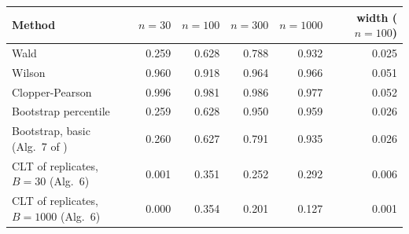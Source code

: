 \begin{tabular}{lrrrrr}\toprule
Method & $n=30$ & $n=100$ & $n=300$ & $n=1000$ & width ($n{=}100$)\\\midrule
Wald & 0.259 & 0.628 & 0.788 & 0.932 & 0.025\\
Wilson & 0.960 & 0.918 & 0.964 & 0.966 & 0.051\\
Clopper-Pearson & 0.996 & 0.981 & 0.986 & 0.977 & 0.052\\
Bootstrap percentile & 0.259 & 0.628 & 0.950 & 0.959 & 0.026\\
Bootstrap, basic (Alg.~7 of \cite{almohamad2024}) & 0.260 & 0.627 & 0.791 & 0.935 & 0.026\\
CLT of replicates, $B=30$ (Alg.~6) & 0.001 & 0.351 & 0.252 & 0.292 & 0.006\\
CLT of replicates, $B=1000$ (Alg.~6) & 0.000 & 0.354 & 0.201 & 0.127 & 0.001\\
\bottomrule\end{tabular}
